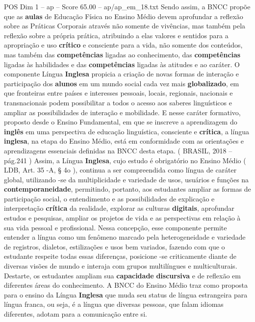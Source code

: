 \begin{textsample}{POS Dim 1 – ap – Score 65.00 – ap/ap\_em\_18.txt}
Sendo assim, a BNCC propõe que as \textbf{aulas} de Educação Física no Ensino Médio devem aprofundar a reflexão sobre as Práticas Corporais através não somente de vivências, mas também pela reflexão sobre a própria prática, atribuindo a elas valores e sentidos para a apropriação e uso \textbf{crítico} e consciente para a vida, não somente dos conteúdos, mas também das \textbf{competências} ligadas ao conhecimento, das \textbf{competências} ligadas às habilidades e das \textbf{competências} ligadas às atitudes e ao caráter.
O componente Língua \textbf{Inglesa} propicia a criação de novas formas de interação e participação dos \textbf{alunos} em um mundo social cada vez mais \textbf{globalizado}, em que fronteiras entre países e interesses pessoais, locais, regionais, nacionais e transnacionais podem possibilitar a todos o acesso aos saberes linguísticos e ampliar as possibilidades de interação e mobilidade.
E nesse caráter formativo, proposto desde o Ensino Fundamental, em que se inscreve a aprendizagem do \textbf{inglês} em uma perspectiva de educação linguística, consciente e \textbf{crítica}, a língua \textbf{inglesa}, na etapa do Ensino Médio, está em conformidade com as orientações e aprendizagens essenciais definidas na BNCC desta etapa. ( BRASIL, 2018 – pág.241 ) Assim, a Língua \textbf{Inglesa}, cujo estudo é obrigatório no Ensino Médio ( LDB, Art. 35 -A, § 4o ), continua a ser compreendida como língua de caráter global, utilizando -se da multiplicidade e variedade de usos, usuários e funções na \textbf{contemporaneidade}, permitindo, portanto, aos estudantes ampliar as formas de participação social, o entendimento e as possibilidades de explicação e interpretação \textbf{crítica} da realidade, explorar as culturas \textbf{digitais}, aprofundar estudos e pesquisas, ampliar os projetos de vida e as perspectivas em relação à sua vida pessoal e profissional.
Nessa concepção, esse componente permite entender a língua como um fenômeno marcado pela heterogeneidade e variedade de registros, dialetos, estilizações e usos bem variados, fazendo com que o estudante respeite todas essas diferenças, posicione -se criticamente diante de diversas visões de mundo e interaja com grupos multilíngues e multiculturais.
Destarte, os estudantes ampliam sua \textbf{capacidade} \textbf{discursiva} e de reflexão em diferentes áreas do conhecimento.
A BNCC do Ensino Médio traz como proposta para o ensino da Língua \textbf{Inglesa} que muda seu status de língua estrangeira para língua franca, ou seja, é a língua que diversas pessoas, que falam idiomas diferentes, adotam para a comunicação entre si.

\end{textsample}
